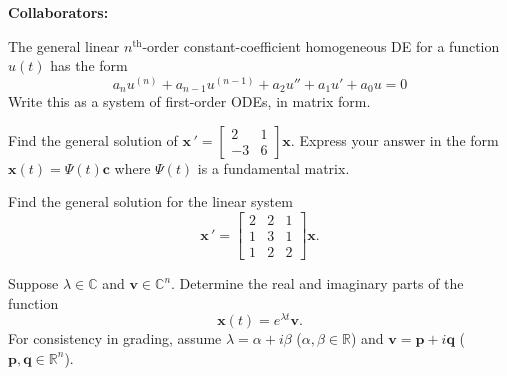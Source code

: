 \documentclass[11pt,letterpaper,boxed]{hmcpset}
\newcommand{\R}{\mathbb{R}}
\newcommand{\C}{\mathbb{C}}
\begin{document}
\noindent\textbf{Collaborators:} 



\begin{problem}[1.] 
The general linear $n^{\text{th}}$-order constant-coefficient homogeneous DE for a function $u(t)$ has the form
\begin{equation}
a_n u^{(n)} + a_{n-1} u^{(n-1)} + a_2 u'' + a_1 u' + a_0 u = 0
\end{equation}
Write this as a system of first-order ODEs, in matrix form.
\end{problem}

\begin{solution}
\vfill
\end{solution}
\newpage

\begin{problem}[2.] 
Find the general solution of $\mathbf{x} \, ' =  \begin{bmatrix} 2 & 1 \\ -3 & 6 \end{bmatrix} \mathbf{x}.$ Express your answer in the form $\mathbf{x}(t) = \Psi(t) \mathbf{c}$ where $\Psi(t)$ is a fundamental matrix.
\end{problem}

\begin{solution}
\vfill
\end{solution}
\newpage

\begin{problem}[3.]
 Find the general solution for the linear system
\begin{equation}
 \mathbf{x} \, ' = \begin{bmatrix} 2 & 2 & 1 \\ 1 & 3 & 1 \\ 1 & 2 &2 \end{bmatrix} \mathbf{x}.
 \end{equation}
\end{problem}

\begin{solution}
\vfill
\end{solution}
\newpage

\begin{problem}[4.]
Suppose  $\lambda \in \C$  and  $\mathbf{v} \in \C^n$. Determine the real and imaginary parts of the  function
\[  \mathbf{x}(t) = e^{\lambda t} \mathbf{v}.  \]
For consistency in grading, assume $\lambda = \alpha + i \beta$   ($\alpha,\beta \in \R$) and $\mathbf{v} = \mathbf{p} + i \mathbf{q}$  ($\mathbf{p},\mathbf{q} \in \R^n$). 
\end{problem}
\end{document}
